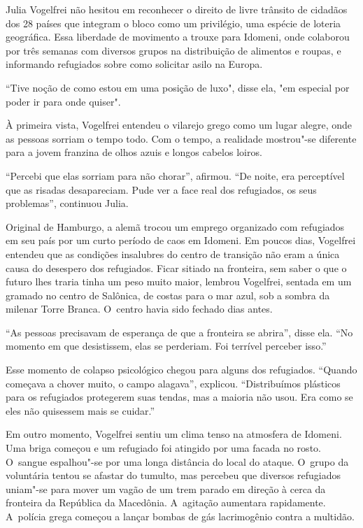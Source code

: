 Julia Vogelfrei não hesitou em reconhecer o direito de livre trânsito de
cidadãos dos 28 países que integram o bloco como um privilégio, uma espécie de loteria geográfica. 
Essa liberdade de movimento a trouxe para Idomeni, onde
colaborou por três semanas com diversos grupos na distribuição de
alimentos e roupas, e informando refugiados sobre como solicitar asilo
na Europa.

``Tive noção de como estou em uma posição de luxo", disse ela, "em especial por poder
ir para onde quiser".

À primeira vista, Vogelfrei entendeu o vilarejo grego como um lugar
alegre, onde as pessoas sorriam o tempo todo. Com o tempo, a realidade
mostrou"-se diferente para a jovem franzina de olhos azuis e longos
cabelos loiros.

``Percebi que elas sorriam para não chorar'', afirmou. ``De noite, era
perceptível que as risadas desapareciam. Pude ver a face real dos
refugiados, os seus problemas'', continuou Julia.

Original de Hamburgo, a alemã trocou um emprego organizado com
refugiados em seu país por um curto período de caos em Idomeni. Em
poucos dias, Vogelfrei entendeu que as condições insalubres do centro de
transição não eram a única causa do desespero dos refugiados. Ficar
sitiado na fronteira, sem saber o que o futuro lhes traria tinha um
peso muito maior, lembrou Vogelfrei, sentada em um gramado no centro de
Salônica, de costas para o mar azul, sob a sombra da milenar Torre
Branca. O~centro havia sido fechado dias antes.

``As pessoas precisavam de esperança de que a fronteira se abrira'',
disse ela. ``No momento em que desistissem, elas se perderiam. Foi
terrível perceber isso.''

Esse momento de colapso psicológico chegou para alguns dos refugiados.
``Quando começava a chover muito, o campo alagava'', explicou.
``Distribuímos plásticos para os refugiados protegerem suas tendas, mas
a maioria não usou. Era como se eles não quisessem mais se cuidar.''

Em outro momento, Vogelfrei sentiu um clima tenso na atmosfera de
Idomeni. Uma briga começou e um refugiado foi atingido por uma facada no
rosto. O~sangue espalhou"-se  por uma longa distância do local do
ataque. O~grupo da voluntária tentou se afastar do tumulto, mas percebeu
que diversos refugiados uniam"-se para mover um vagão de um trem parado
em direção à cerca da fronteira da República da Macedônia. A~agitação
aumentara rapidamente. A~polícia grega começou a lançar bombas de gás
lacrimogênio contra a multidão.

